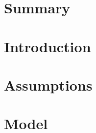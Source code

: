 \documentclass[12pt]{article}
\begin{document}
\cfoot{}


\section{Summary}


\newpage
\begin{center}
\end{center}

\newpage
\tableofcontents

\newpage
\section{Introduction}

\newpage
\section{Assumptions}

\newpage
\section{Model}
\end{document}
